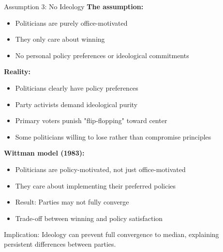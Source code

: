 \documentclass[10pt]{beamer}
\begin{document}
\begin{frame}[allowframebreaks]{Assumption 3: No Ideology}
\textbf{The assumption:}
\begin{itemize}
\item Politicians are \alert{purely office-motivated}
\item They only care about winning
\item No personal policy preferences or ideological commitments
\end{itemize}



\textbf{Reality:}
\begin{itemize}
\item Politicians clearly have \alert{policy preferences}
\item Party activists demand ideological purity
\item Primary voters punish "flip-flopping" toward center
\item Some politicians willing to lose rather than compromise principles
\end{itemize}

  \framebreak  

\textbf{Wittman model (1983):}
\begin{itemize}
\item Politicians are \alert{policy-motivated}, not just office-motivated
\item They care about implementing their preferred policies
\item Result: \alert{Parties may not fully converge}
\item Trade-off between winning and policy satisfaction
\end{itemize}



\alert{Implication:} Ideology can prevent full convergence to median, explaining persistent differences between parties.
\end{frame}
\end{document}
